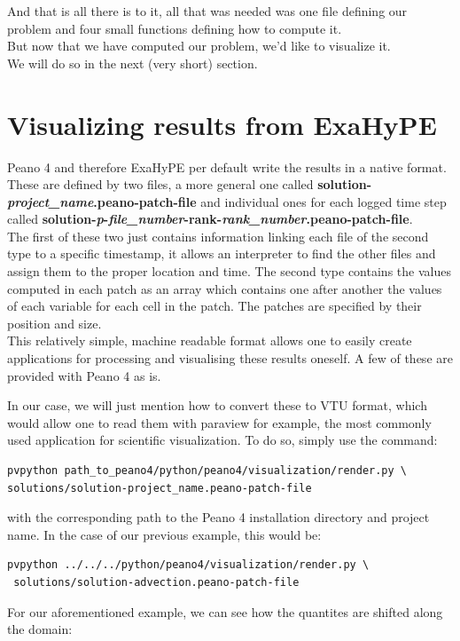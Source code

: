 \documentclass[12pt,letterpaper]{article}
\begin{document}
And that is all there is to it, all that was needed was one file defining our problem and four small functions defining how to compute it. \\
But now that we have computed our problem, we'd like to visualize it.\\
We will do so in the next (very short) section.

\newpage

\section{Visualizing results from ExaHyPE}
\label{Visualize}

\vspace{0.3cm}

Peano 4 and therefore ExaHyPE per default write the results in a native format. These are defined by two files, a more general one called \textbf{solution-\textit{project\_name}.peano-patch-file} and individual ones for each logged time step called \textbf{solution-\textit{p}-\textit{file\_number}-rank-\textit{rank\_number}.peano-patch-file}.\\
The first of these two just contains information linking each file of the second type to a specific timestamp, it allows an interpreter to find the other files and assign them to the proper location and time. The second type contains the values computed in each patch as an array which contains one after another the values of each variable for each cell in the patch. The patches are specified by their position and size.\\
This relatively simple, machine readable format allows one to easily create applications for processing and visualising these results oneself. A few of these are provided with Peano 4 as is.

In our case, we will just mention how to convert these to VTU format, which would allow one to read them with paraview for example, the most commonly used application for scientific visualization.
To do so, simply use the command:
\begin{lstlisting}[style = Bash]
pvpython path_to_peano4/python/peano4/visualization/render.py \
solutions/solution-project_name.peano-patch-file
\end{lstlisting}
with the corresponding path to the Peano 4 installation directory and project name. In the case of our previous example, this would be:
\begin{lstlisting}[style = Bash]
pvpython ../../../python/peano4/visualization/render.py \
 solutions/solution-advection.peano-patch-file
\end{lstlisting}
For our aforementioned example, we can see how the quantites are shifted along the domain:
\end{document}
